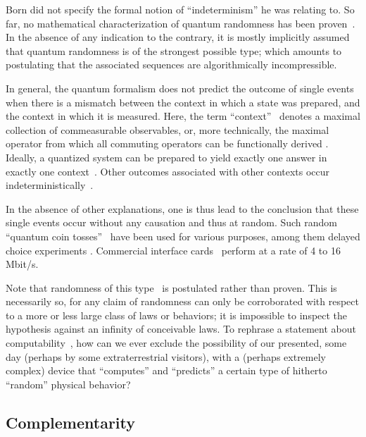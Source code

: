 \documentclass[rmp,amsfonts,showpacs,showkeys,twocolumn]{revtex4}
\begin{document}
Born did not specify the formal notion of ``indeterminism'' he was relating to.
So far, no mathematical characterization of quantum randomness has been proven~\cite{2008-cal-svo}.
In the absence of any indication to the contrary, it is mostly implicitly assumed
that quantum randomness is of the strongest possible type;
which amounts to postulating that the associated sequences are algorithmically incompressible.


In general, the quantum formalism does not predict the outcome of single events
when there is a mismatch between the context in which a state was prepared,
and the context in which it is measured.
Here, the term ``context''~\cite{svozil-2006-omni,svozil-2008-ql}
denotes a maximal collection of commeasurable observables,
or, more technically,
the maximal operator from which all commuting operators can be functionally derived
\cite[\S 84]{halmos-vs}.
Ideally, a quantized system can be prepared
to yield exactly one answer in exactly one context~\cite{zeil-99,DonSvo01,svozil-2002-statepart-prl}.
Other outcomes associated with other contexts occur indeterministically~\cite{2008-cal-svo}.

In the absence of other explanations, one is thus lead to the conclusion
that these single events occur without any causation
and thus at random.
Such random ``quantum coin tosses''~\cite{svozil-qct,rarity-94,zeilinger:qct,stefanov-2000,0256-307X-21-10-027,wang:056107,fiorentino:032334,svozil-2009-howto}
have been used for various purposes, among them delayed choice experiments
\cite{wjswz-98,zeilinger:qct}.
Commercial interface cards~\cite{Quantis} perform at a rate of 4 to 16 Mbit/s.

Note that randomness of this type~\cite{Cris04,calude-dinneen05}
is postulated rather than proven.
This is necessarily so, for any claim of randomness can only be corroborated
with respect to a more or less large class of laws or behaviors;
it is impossible to inspect the hypothesis against an infinity of conceivable laws.
To rephrase a statement about computability~\cite[p. 11]{davis-58}, how can we ever exclude the possibility of our
presented, some day (perhaps by some extraterrestrial visitors), with a (perhaps
extremely complex) device  that ``computes'' and ``predicts''
a certain type of hitherto ``random'' physical behavior?


\subsection{Complementarity}
\end{document}

